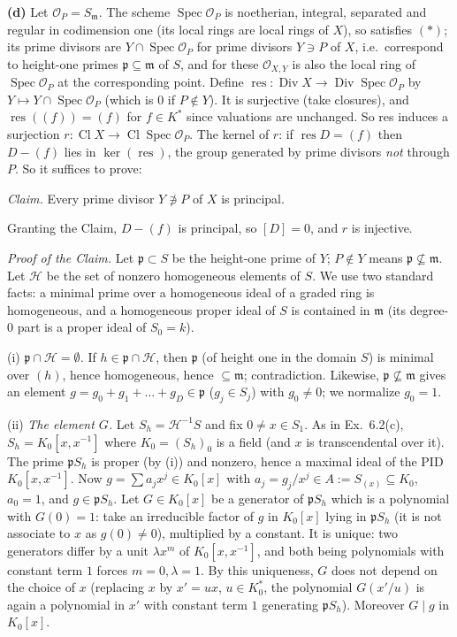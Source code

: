 \documentclass[11pt]{article}
\begin{document}
\textbf{(d)} Let $\mathcal O_P=S_{\mathfrak m}$. The scheme $\operatorname{Spec}\mathcal O_P$ is noetherian, integral, separated and regular in codimension one (its local rings are local rings of $X$), so satisfies $(*)$; its prime divisors are $Y\cap\operatorname{Spec}\mathcal O_P$ for prime divisors $Y\ni P$ of $X$, i.e.\ correspond to height-one primes $\mathfrak p\subseteq\mathfrak m$ of $S$, and for these $\mathcal O_{X,Y}$ is also the local ring of $\operatorname{Spec}\mathcal O_P$ at the corresponding point. Define $\operatorname{res}:\operatorname{Div}X\to\operatorname{Div}\operatorname{Spec}\mathcal O_P$ by $Y\mapsto Y\cap\operatorname{Spec}\mathcal O_P$ (which is $0$ if $P\notin Y$). It is surjective (take closures), and $\operatorname{res}((f))=(f)$ for $f\in K^*$ since valuations are unchanged. So res induces a surjection $r:\operatorname{Cl}X\to\operatorname{Cl}\operatorname{Spec}\mathcal O_P$. The kernel of $r$: if $\operatorname{res}D=(f)$ then $D-(f)$ lies in $\ker(\operatorname{res})$, the group generated by prime divisors \emph{not} through $P$. So it suffices to prove:

\emph{Claim.} Every prime divisor $Y\not\ni P$ of $X$ is principal.

Granting the Claim, $D-(f)$ is principal, so $[D]=0$, and $r$ is injective. 

\emph{Proof of the Claim.} Let $\mathfrak p\subset S$ be the height-one prime of $Y$; $P\notin Y$ means $\mathfrak p\not\subseteq\mathfrak m$. Let $\mathcal H$ be the set of nonzero homogeneous elements of $S$. We use two standard facts: a minimal prime over a homogeneous ideal of a graded ring is homogeneous, and a homogeneous proper ideal of $S$ is contained in $\mathfrak m$ (its degree-$0$ part is a proper ideal of $S_0=k$).

(i) \emph{$\mathfrak p\cap\mathcal H=\emptyset$.} If $h\in\mathfrak p\cap\mathcal H$, then $\mathfrak p$ (of height one in the domain $S$) is minimal over $(h)$, hence homogeneous, hence $\subseteq\mathfrak m$; contradiction. Likewise, $\mathfrak p\not\subseteq\mathfrak m$ gives an element $g=g_0+g_1+\dots+g_D\in\mathfrak p$ ($g_j\in S_j$) with $g_0\ne0$; we normalize $g_0=1$.

(ii) \emph{The element $G$.} Let $S_h=\mathcal H^{-1}S$ and fix $0\ne x\in S_1$. As in Ex.~6.2(c), $S_h=K_0[x,x^{-1}]$ where $K_0=(S_h)_0$ is a field (and $x$ is transcendental over it). The prime $\mathfrak pS_h$ is proper (by (i)) and nonzero, hence a maximal ideal of the PID $K_0[x,x^{-1}]$. Now $g=\sum a_jx^j\in K_0[x]$ with $a_j=g_j/x^j\in A:=S_{(x)}\subseteq K_0$, $a_0=1$, and $g\in\mathfrak pS_h$. Let $G\in K_0[x]$ be a generator of $\mathfrak pS_h$ which is a polynomial with $G(0)=1$: take an irreducible factor of $g$ in $K_0[x]$ lying in $\mathfrak pS_h$ (it is not associate to $x$ as $g(0)\ne0$), multiplied by a constant. It is unique: two generators differ by a unit $\lambda x^m$ of $K_0[x,x^{-1}]$, and both being polynomials with constant term $1$ forces $m=0,\lambda=1$. By this uniqueness, $G$ does not depend on the choice of $x$ (replacing $x$ by $x'=ux$, $u\in K_0^*$, the polynomial $G(x'/u)$ is again a polynomial in $x'$ with constant term $1$ generating $\mathfrak pS_h$). Moreover $G\mid g$ in $K_0[x]$.
\end{document}
